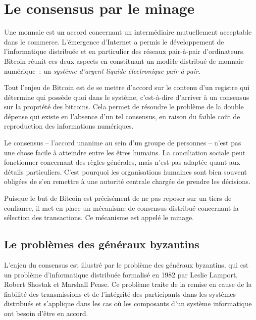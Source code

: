 
\chapter{Le consensus par le minage}
\label{ch:confirmation}

Une monnaie est un accord concernant un intermédiaire mutuellement acceptable dans le commerce. L'émergence d'Internet a permis le développement de l'informatique distribuée et en particulier des réseaux pair-à-pair d'ordinateurs. Bitcoin réunit ces deux aspects en constituant un modèle distribué de monnaie numérique~: un \emph{système d'argent liquide électronique pair-à-pair}.


Tout l'enjeu de Bitcoin est de se mettre d'accord sur le contenu d'un registre qui détermine qui possède quoi dans le système, c'est-à-dire d'arriver à un consensus sur la propriété des bitcoins. Cela permet de résoudre le problème de la double dépense qui existe en l'absence d'un tel consensus, en raison du faible coût de reproduction des informations numériques.

Le consensus -- l'accord unanime au sein d'un groupe de personnes -- n'est pas une chose facile à atteindre entre les êtres humains. La conciliation sociale peut fonctionner concernant des règles générales, mais n'est pas adaptée quant aux détails particuliers. C'est pourquoi les organisations humaines sont bien souvent obligées de s'en remettre à une autorité centrale chargée de prendre les décisions.

Puisque le but de Bitcoin est précisément de ne pas reposer sur un tiers de confiance, il met en place un mécanisme de consensus distribué concernant la sélection des transactions. Ce mécanisme est appelé le minage.


\section*{Le problèmes des généraux byzantins} %

L'enjeu du consensus est illustré par le problème des généraux byzantins, qui est un problème d'informatique distribuée formalisé en 1982 par Leslie Lamport, Robert Shostak et Marshall Pease. Ce problème traite de la remise en cause de la fiabilité des transmissions et de l'intégrité des participants dans les systèmes distribués et s'applique dans les cas où les composants d'un système informatique ont besoin d'être en accord.

